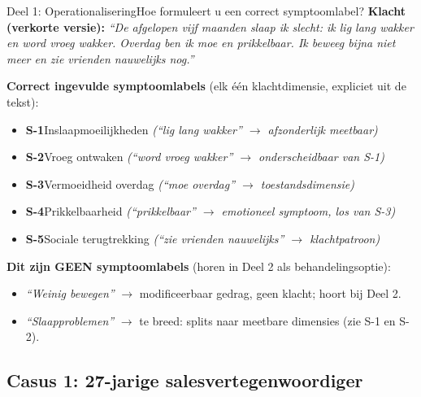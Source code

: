 \documentclass[11pt,a4paper]{article}
\begin{document}
\vspace{0.5em}
\nopagebreak[4]

\begin{voorbeeldbox}{Deel 1: Operationalisering}{Hoe formuleert u een correct symptoomlabel?}
\small
\textbf{Klacht (verkorte versie):} \textit{``De afgelopen vijf maanden slaap ik slecht:
ik lig lang wakker en word vroeg wakker. Overdag ben ik moe en prikkelbaar. Ik beweeg
bijna niet meer en zie vrienden nauwelijks nog.''}

\medskip
\textbf{Correct ingevulde symptoomlabels} (elk één klachtdimensie, expliciet uit de tekst):
\begin{itemize}[topsep=2pt,itemsep=1pt]
\item \textbf{S-1}\enspace Inslaapmoeilijkheden
  \hfill\textit{(``lig lang wakker'' $\rightarrow$ afzonderlijk meetbaar)}
\item \textbf{S-2}\enspace Vroeg ontwaken
  \hfill\textit{(``word vroeg wakker'' $\rightarrow$ onderscheidbaar van S-1)}
\item \textbf{S-3}\enspace Vermoeidheid overdag
  \hfill\textit{(``moe overdag'' $\rightarrow$ toestandsdimensie)}
\item \textbf{S-4}\enspace Prikkelbaarheid
  \hfill\textit{(``prikkelbaar'' $\rightarrow$ emotioneel symptoom, los van S-3)}
\item \textbf{S-5}\enspace Sociale terugtrekking
  \hfill\textit{(``zie vrienden nauwelijks'' $\rightarrow$ klachtpatroon)}
\end{itemize}

\medskip
\textbf{\color{StrongRed}Dit zijn GEEN symptoomlabels} (horen in Deel 2 als behandelingsoptie):
\begin{itemize}[topsep=1pt,itemsep=0pt]
\item \textit{``Weinig bewegen''} $\rightarrow$ modificeerbaar gedrag, geen klacht; hoort bij Deel 2.
\item \textit{``Slaapproblemen''} $\rightarrow$ te breed: splits naar meetbare dimensies (zie S-1 en S-2).
\end{itemize}
\end{voorbeeldbox}

\vspace{0.5em}

\newpage

\subsection*{Casus 1: 27-jarige salesvertegenwoordiger}
\end{document}
